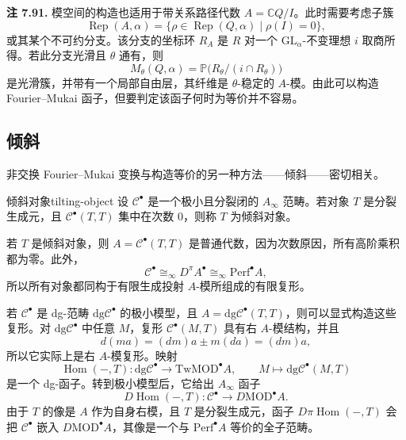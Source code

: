 \begin{note}\label{note:quiver-relations-moduli}
\textbf{注 7.91.} 模空间的构造也适用于带关系路径代数 $A=\mathbb C Q/I$。此时需要考虑子簇
\[
  \operatorname{Rep}(A,\alpha)
  =\{\rho\in\operatorname{Rep}(Q,\alpha)\mid\rho(I)=0\},
\]
或其某个不可约分支。该分支的坐标环 $R_A$ 是 $R$ 对一个 $\mathrm{GL}_\alpha$-不变理想 $i$ 取商所得。若此分支光滑且 $\theta$ 通有，则
\[
  M_\theta(Q,\alpha)=\mathbb P\bigl(R_\theta/(i\cap R_\theta)\bigr)
\]
是光滑簇，并带有一个局部自由层，其纤维是 $\theta$-稳定的 $A$-模。由此可以构造 Fourier--Mukai 函子，但要判定该函子何时为等价并不容易。
\end{note}

\subsection{倾斜}\label{subsec:tilting}
非交换 Fourier--Mukai 变换与构造等价的另一种方法——倾斜——密切相关。

\begin{definition}{倾斜对象}{tilting-object}
设 $\mathcal C^{\bullet}$ 是一个极小且分裂闭的 $A_\infty$ 范畴。若对象 $T$ 是分裂生成元，且 $\mathcal C^{\bullet}(T,T)$ 集中在次数 $0$，则称 $T$ 为倾斜对象。
\end{definition}

若 $T$ 是倾斜对象，则 $A=\mathcal C^{\bullet}(T,T)$ 是普通代数，因为次数原因，所有高阶乘积都为零。此外，
\[
  \mathcal C^{\bullet}\cong_\infty D^{\pi}A^{\bullet}
  \cong_\infty\mathrm{Perf}^{\bullet}A,
\]
所以所有对象都同构于有限生成投射 $A$-模所组成的有限复形。

若 $\mathcal C^{\bullet}$ 是 dg-范畴 $\mathrm{dg}\mathcal C^{\bullet}$ 的极小模型，且 $A=\mathrm{dg}\mathcal C^{\bullet}(T,T)$，则可以显式构造这些复形。对 $\mathrm{dg}\mathcal C^{\bullet}$ 中任意 $M$，复形 $\mathcal C^{\bullet}(M,T)$ 具有右 $A$-模结构，并且
\[
  d(ma)=(dm)a\pm m(da)=(dm)a,
\]
所以它实际上是右 $A$-模复形。映射
\[
  \operatorname{Hom}(-,T)\colon\mathrm{dg}\mathcal C^{\bullet}
  \longrightarrow\mathrm{TwMOD}^{\bullet}A,
  \qquad M\longmapsto\mathrm{dg}\mathcal C^{\bullet}(M,T)
\]
是一个 dg-函子。转到极小模型后，它给出 $A_\infty$ 函子
\[
  D\operatorname{Hom}(-,T)\colon\mathcal C^{\bullet}
  \longrightarrow D\mathrm{MOD}^{\bullet}A.
\]
由于 $T$ 的像是 $A$ 作为自身右模，且 $T$ 是分裂生成元，函子 $D\pi\operatorname{Hom}(-,T)$ 会把 $\mathcal C^{\bullet}$ 嵌入 $D\mathrm{MOD}^{\bullet}A$，其像是一个与 $\mathrm{Perf}^{\bullet}A$ 等价的全子范畴。

